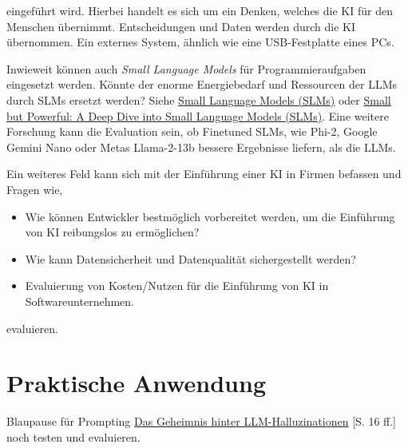 eingeführt wird. Hierbei handelt es sich um ein Denken, welches die KI für den Menschen übernimmt. Entscheidungen und Daten werden durch die KI übernommen. Ein externes System, ähnlich wie eine USB-Festplatte eines PCs.\vspace{0.2cm}

Inwieweit können auch \textit{Small Language Models} für Programmieraufgaben eingesetzt werden. Könnte der enorme Energiebedarf und Ressourcen der LLMs durch SLMs ersetzt werden? Siehe 
\href{https://medium.com/@nageshmashette32/small-language-models-slms-305597c9edf2}{Small Language Models (SLMs)} oder \href{https://medium.com/version-1/small-but-powerful-a-deep-dive-into-small-language-models-slms-b793bdb002f2}{Small but Powerful: A Deep Dive into Small Language Models (SLMs)}. Eine weitere Forschung kann die Evaluation sein, ob Finetuned SLMs, wie Phi-2, Google Gemini Nano oder Metas Llama-2-13b bessere Ergebnisse liefern, als die LLMs.\vspace{0.2cm}

Ein weiteres Feld kann sich mit der Einführung einer KI in Firmen befassen und Fragen wie,

\begin{itemize}
	\item Wie können Entwickler bestmöglich vorbereitet werden, um die Einführung von KI reibungslos zu ermöglichen?
	\item Wie kann Datensicherheit und Datenqualität sichergestellt werden?
	\item Evaluierung von Kosten/Nutzen für die Einführung von KI in Softwareunternehmen.
\end{itemize}

evaluieren.



\section{Praktische Anwendung}
Blaupause für Prompting \href{https://piamedia.com/wp-content/uploads/2024/09/PIAM_Whitepaper_LLM-Halluzinationen_DE.pdf}{Das Geheimnis hinter LLM-Halluzinationen} [S. 16 ff.] noch testen und evaluieren.

